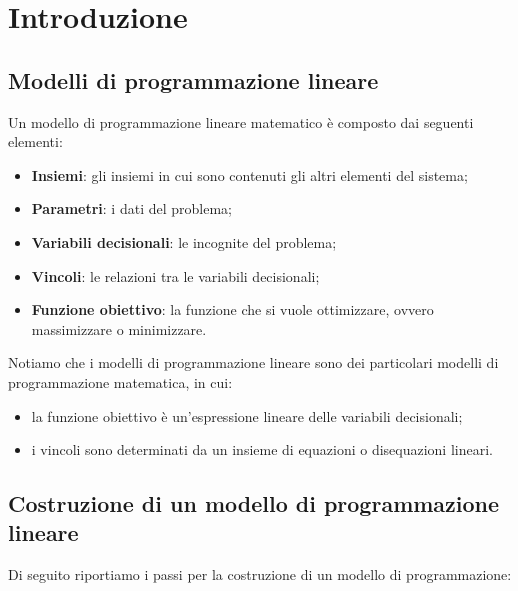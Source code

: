 \documentclass[12pt]{article}
\begin{document}
\copertina
\tableofcontents
\newpage

\section{Introduzione}

\subsection{Modelli di programmazione lineare}

Un modello di programmazione lineare matematico è composto dai seguenti
elementi:
\begin{itemize}
	\item \textbf{Insiemi}: gli insiemi in cui sono contenuti gli altri elementi
	      del sistema;

	\item \textbf{Parametri}: i dati del problema;

	\item \textbf{Variabili decisionali}: le incognite del problema;

	\item \textbf{Vincoli}: le relazioni tra le variabili decisionali;

	\item \textbf{Funzione obiettivo}: la funzione che si vuole ottimizzare, ovvero
	      massimizzare o minimizzare.
\end{itemize}

Notiamo che i modelli di programmazione lineare sono dei particolari modelli di
programmazione matematica, in cui:
\begin{itemize}
	\item la funzione obiettivo è un'espressione lineare delle variabili
	      decisionali;

	\item i vincoli sono determinati da un insieme di equazioni o disequazioni
	      lineari.
\end{itemize}

\subsection{Costruzione di un modello di programmazione lineare}

Di seguito riportiamo i passi per la costruzione di un modello di
programmazione:
\end{document}
